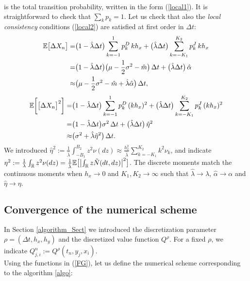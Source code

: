 is the total transition
probability, written in the form (\ref{local1}). It is straightforward to check that $\sum_k p_k =1$.  
Let us check that also the \emph{local consistency} conditions (\ref{local2}) are satisfied at first order in $\Delta t$:
\begin{align*}
\mathbb{E} \bigl[ \Delta X_n \bigr] =& \bigl(1 - \hat \lambda \Delta t \bigr) \sum_{k=-1}^1 p^D_k \, k h_x 
           + \bigl( \hat \lambda \Delta t \bigr) \sum_{k = -K_1}^{K_2} p^J_k \, k h_x \\
           =& \bigl(1 - \hat \lambda \Delta t \bigr) \bigl( \mu - \frac{1}{2}\sigma^2 -\hat m \bigr) \, \Delta t  
           + \bigl(\hat \lambda \Delta t \bigr) \, \hat \alpha \\
           \approx& \bigl( \mu - \frac{1}{2}\sigma^2 - \hat m + \hat \lambda \hat \alpha \bigr) \, \Delta t ,
\end{align*}
\begin{align*}
 \mathbb{E} \biggl[ \bigl[ \Delta X_n \bigr]^2 \biggr] =&
 \bigl(1 - \hat \lambda \Delta t \bigr) \sum_{k=-1}^1 p^D_k \, (k h_x)^2 + \bigl( \hat \lambda \Delta t \bigr) \sum_{k = -K_1}^{K_2} p^J_k \, (k h_x)^2 \\
           =& \bigl(1 - \hat \lambda \Delta t \bigr) \sigma^2 \, \Delta t  
           + \bigl(\hat \lambda \Delta t \bigr) \,  \hat \eta^2 \\
 \approx& \bigl( \sigma^2 + \hat \lambda \hat \eta^2 \bigr) \, \Delta t.
\end{align*}
We introduced $\hat \eta^2 := \frac{1}{\hat \lambda} \int_{-B_1}^{B_2} z^2 \nu(dz)  
\approx \frac{h_x^2}{\hat \lambda} \sum_{k = -K_1}^{K_2} k^2 \nu_k $, and indicate $\eta^2 := \frac{1}{\lambda} \int_{\mathbb{R}} z^2 \nu(dz) 
= \frac{1}{\hat \lambda} \mathbb{E} \bigl[ \bigl| \int_{\mathbb{R}} z \tilde N(dt,dz) \bigr|^2 \bigr]$.
The discrete moments match the continuous moments when 
$h_x \to 0$ and $K_1,K_2 \to \infty$ such that 
$\hat \lambda \to \lambda$,
$\hat \alpha \to \alpha$ and $\hat \eta \to \eta$.



\subsection{Convergence of the numerical scheme}

In Section \ref{algorithm_Sect} we introduced the discretization parameter $\rho = (\Delta t, h_x, h_y)$ and the discretized value function $Q^{\rho}$. 
For a fixed $\rho$, we indicate $Q^n_{j,i} := Q^{\rho}(t_n,y_j,x_i)$.\\
Using the functions in (\ref{FG}), let us define the numerical scheme corresponding to the algorithm \ref{algo}:

